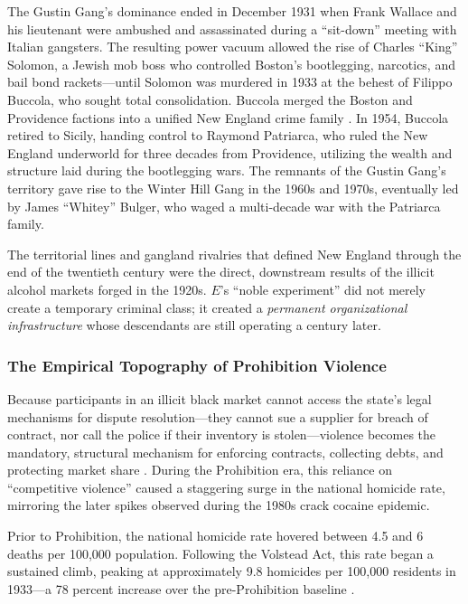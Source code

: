 \documentclass[12pt,openany]{book}
\begin{document}
The Gustin Gang's dominance ended in December 1931 when Frank Wallace and his lieutenant were ambushed and assassinated during a ``sit-down'' meeting with Italian gangsters. The resulting power vacuum allowed the rise of Charles ``King'' Solomon, a Jewish mob boss who controlled Boston's bootlegging, narcotics, and bail bond rackets---until Solomon was murdered in 1933 at the behest of Filippo Buccola, who sought total consolidation. Buccola merged the Boston and Providence factions into a unified New England crime family \cite{wikipedia_patriarca, mobmuseum_patriarca}. In 1954, Buccola retired to Sicily, handing control to Raymond Patriarca, who ruled the New England underworld for three decades from Providence, utilizing the wealth and structure laid during the bootlegging wars. The remnants of the Gustin Gang's territory gave rise to the Winter Hill Gang in the 1960s and 1970s, eventually led by James ``Whitey'' Bulger, who waged a multi-decade war with the Patriarca family.

The territorial lines and gangland rivalries that defined New England through the end of the twentieth century were the direct, downstream results of the illicit alcohol markets forged in the 1920s. $E$'s ``noble experiment'' did not merely create a temporary criminal class; it created a \textit{permanent organizational infrastructure} whose descendants are still operating a century later.

\subsubsection{The Empirical Topography of Prohibition Violence}

Because participants in an illicit black market cannot access the state's legal mechanisms for dispute resolution---they cannot sue a supplier for breach of contract, nor call the police if their inventory is stolen---violence becomes the mandatory, structural mechanism for enforcing contracts, collecting debts, and protecting market share \cite{hoplofobia_prohibition}. During the Prohibition era, this reliance on ``competitive violence'' caused a staggering surge in the national homicide rate, mirroring the later spikes observed during the 1980s crack cocaine epidemic.

Prior to Prohibition, the national homicide rate hovered between 4.5 and 6 deaths per 100,000 population. Following the Volstead Act, this rate began a sustained climb, peaking at approximately 9.8 homicides per 100,000 residents in 1933---a 78 percent increase over the pre-Prohibition baseline \cite{bjs_homicide, cdc_homicide}.
\end{document}
